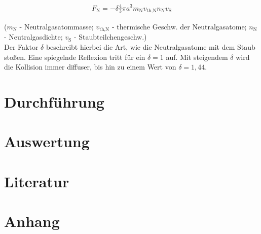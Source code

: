 \documentclass[numbers=noenddot,a4paper]{scrartcl}
\newcommand{\ix}[1]{_\text{#1}}
\begin{document}
					\begin{align}
						F\ix{N}=-\delta\frac{4}{3}\pi a^3m\ix{N}v\ix{th,N}n\ix{N}v\ix{S}
					\end{align}
					
				($m\ix{N}$ - Neutralgasatommasse; $v\ix{th,N}$ - thermische Geschw. der Neutralgasatome; $n\ix{N}$ - Neutralgasdichte; $v\ix{S}$ - Staubteilchengeschw.)\\
				Der Faktor $\delta$ beschreibt hierbei die Art, wie die Neutralgasatome mit dem Staub stoßen. Eine spiegelnde Reflexion tritt für ein $\delta=1$ auf. Mit steigendem $\delta$ wird die Kollision immer diffuser, bis hin zu einem Wert von $\delta=1,44$.
	\newpage
	
	\section{Durchführung}\label{sec:durch}
	
	\newpage
	
	\section{Auswertung}\label{sec:auswert}
	
	\newpage
	
	\section{Literatur}\label{sec:lit}
	
		
		
	
	\newpage
	
	\section{Anhang}\label{sec:anhang}
	
%		
%				
	
\end{document}
